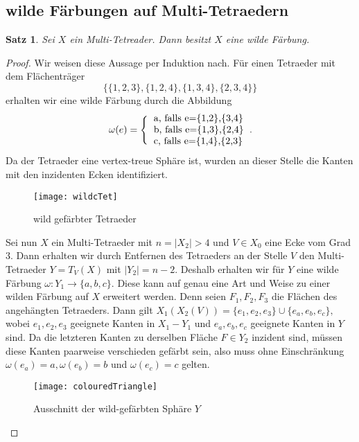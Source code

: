 \documentclass[12pt,titlepage,twoside,cleardoublepage]{article}
\theoremstyle{nummermitklammern}
\newtheorem{satz}[temp]{Satz}
\newtheorem{satz}[zahl]{Satz}
\numberwithin{equation}{section}
\begin{document}
\subsection{wilde Färbungen auf Multi-Tetraedern}
\begin{satz}\label{wild}
Sei $X$ ein Multi-Tetreader. Dann besitzt $X$ eine wilde Färbung.
\end{satz}
\begin{proof}
Wir weisen diese Aussage per Induktion nach. Für einen Tetraeder mit dem Flächenträger
\[
\{\{1,2,3\},\{1,2,4\},\{1,3,4\},\{2,3,4\}\}
\] erhalten wir eine wilde Färbung durch die Abbildung
\begin{align*}
\omega(e)=\Biggl\{
\begin{tabular}[l]{lcr}
a, falls e=\{1,2\},\{3,4\}\\
b, falls e=\{1,3\},\{2,4\}\\
c, falls e=\{1,4\},\{2,3\}
\end{tabular}.
\end{align*}
Da der Tetraeder eine vertex-treue Sphäre ist, wurden an dieser Stelle die Kanten mit den inzidenten Ecken identifiziert.
\begin{figure}[H]
\begin{center}
\texttt{[image: wildcTet]}
\end{center}
\caption{wild gefärbter Tetraeder}
\end{figure}
Sei nun $X$ ein Multi-Tetraeder mit $n=\vert X_2 \vert >4$ und $V\in X_0$ eine Ecke vom Grad 3. Dann erhalten wir durch Entfernen des Tetraeders an der Stelle $V$ den Multi-Tetraeder $Y=T_V(X)$ mit $\vert Y_2 \vert=n-2.$ Deshalb erhalten wir für $Y$ eine wilde Färbung $\omega:Y_1\to \{a,b,c\}.$ Diese kann auf genau eine Art und Weise zu einer wilden Färbung auf $X$ erweitert werden.
Denn seien $F_1,F_2,F_3$ die Flächen des angehängten Tetraeders. Dann gilt $X_1(X_2(V))=\{e_1,e_2,e_3\}\cup \{e_a,e_b,e_c\},$ wobei $e_1,e_2,e_3$ geeignete Kanten in $X_1-Y_1$ und $e_a,e_b,e_c$ geeignete Kanten in $Y$ sind. Da die letzteren Kanten zu derselben Fläche $F\in Y_2$ inzident sind, müssen diese Kanten paarweise verschieden gefärbt sein, also  muss ohne Einschränkung $
\omega(e_a)=a,\omega(e_b)=b$ und $\omega(e_c)=c$
gelten.
\begin{figure}[H]
\begin{center}
\texttt{[image: colouredTriangle]}
\end{center}
\caption{Ausschnitt der wild-gefärbten Sphäre $Y$}
\end{figure}

\end{proof}
\end{document}
